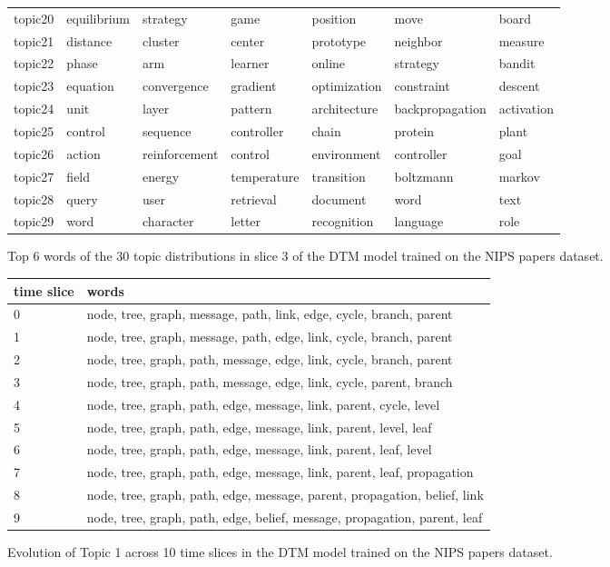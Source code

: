 \documentclass[letterpaper]{article}
\begin{document}
\begin{figure}[ht]
\begin{tabular}{l | l l l l l l}
    topic20 & 	equilibrium & 	strategy & 	game & 	position & 	move & 	board \\
    topic21 & 	distance & 	cluster & 	center & 	prototype & 	neighbor & 	measure \\
    topic22 & 	phase & 	arm & 	learner & 	online & 	strategy & 	bandit \\
    topic23 & 	equation & 	convergence & 	gradient & 	optimization & 	constraint & 	descent \\
    topic24 & 	unit & 	layer & 	pattern & 	architecture & 	backpropagation & 	activation \\
    topic25 & 	control & 	sequence & 	controller & 	chain & 	protein & 	plant \\
    topic26 & 	action & 	reinforcement & 	control & 	environment & 	controller & 	goal \\
    topic27 & 	field & 	energy & 	temperature & 	transition & 	boltzmann & 	markov \\
    topic28 & 	query & 	user & 	retrieval & 	document & word & text \\
    topic29 & word & character & letter & recognition & language & role \\
  \end{tabular}
  \caption{\label{fig:dtm_slice3} Top 6 words of the 30 topic distributions in slice 3 of the DTM model trained on the NIPS papers dataset.}
\end{figure}

\begin{figure}[ht]
  \centering
  \begin{tabular}{|l | l |}
    \hline
     time slice & words \\ \hline
    0 & node, tree, graph, message, path, link, edge, cycle, branch, parent \\ \hline
    1 &	node, tree, graph, message, path, edge, link, cycle, branch, parent \\ \hline
    2 &	node, tree, graph, path, message, edge, link, cycle, branch, parent \\ \hline
    3 & node, tree, graph, path, message, edge, link, cycle, parent, branch \\ \hline
    4 &	node, tree, graph, path, edge, message, link, parent, cycle, level \\ \hline
    5 &	node, tree, graph, path, edge, message, link, parent, level, leaf \\ \hline
    6 &	node, tree, graph, path, edge, message, link, parent, leaf, level \\ \hline
    7 &	node, tree, graph, path, edge, message, link, parent, leaf, propagation \\ \hline
    8 &	node, tree, graph, path, edge, message, parent, propagation, belief, link \\ \hline
    9 &	node, tree,	graph, path, edge, belief, message, propagation, parent,	leaf \\ \hline
  \end{tabular}
  \caption{\label{fig:dtm_evo} Evolution of Topic 1 across 10 time
    slices in the DTM model trained on the NIPS papers dataset.}
\end{figure}
\end{document}
